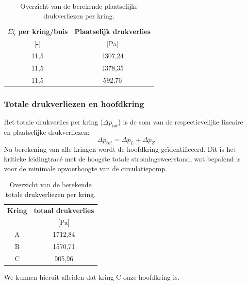 \documentclass[a4paper,12pt]{article}
\begin{document}
\begin{table}[!ht]
    \centering
    \caption{Overzicht van de berekende plaatselijke drukverliezen per kring.}
    \label{tab:plaatselijke_drukverliezen_pa}
    \begin{tabular}{cc}
        \toprule
        \rowcolor{gray!20}
        \textbf{$\Sigma \zeta$ per kring/buis} & \textbf{Plaatselijk drukverlies} \\
        \rowcolor{gray!20}
        \textbf{[-]} & [\unit{\pascal}] \\
        \midrule
        11,5 & 1307,24 \\
        11,5 & 1378,35 \\
        11,5 & 592,76 \\
        \bottomrule
    \end{tabular}
\end{table}

\subsubsection{Totale drukverliezen en hoofdkring}
Het totale drukverlies per kring ($\Delta p_{tot}$) is de som van de respectievelijke lineaire en plaatselijke drukverliezen:
\begin{equation}
    \Delta p_{tot} = \Delta p_L + \Delta p_Z
\end{equation}
Na berekening van alle kringen wordt de hoofdkring geïdentificeerd. Dit is het kritieke leidingtracé met de hoogste totale stromingsweerstand, wat bepalend is voor de minimale opvoerhoogte van de circulatiepomp.

\begin{table}[!ht]
    \centering
    \caption{Overzicht van de berekende totale drukverliezen per kring.}
    \label{tab:plaatselijke_drukverliezen_pa}
    \begin{tabular}{cc}
        \toprule
        \rowcolor{gray!20}
        \textbf{Kring} & \textbf{totaal drukverlies} \\
        \rowcolor{gray!20}
        \textbf & [\unit{\pascal}] \\
        \midrule
        A & 1712,84 \\
        B & 1570,71 \\
        C & 905,96 \\
        \bottomrule
    \end{tabular}
\end{table}


We kunnen hieruit afleiden dat kring C onze hoofdkring is.
\end{document}
